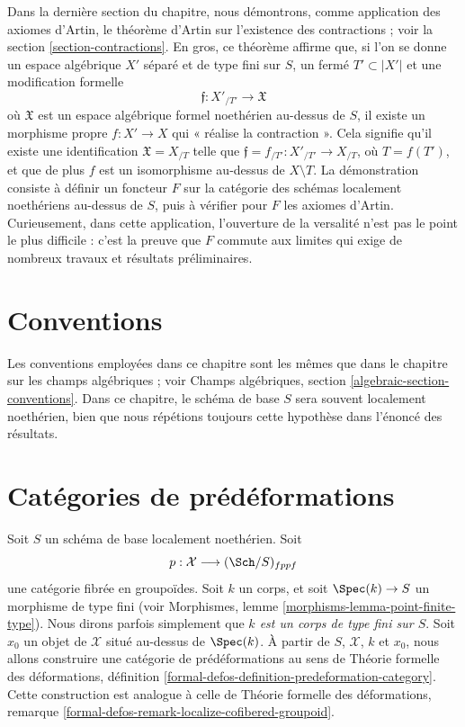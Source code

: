 \medskip\noindent
Dans la dernière section du chapitre, nous démontrons, comme application des
axiomes d'Artin, le théorème d'Artin sur l'existence des contractions ; voir la
section \ref{section-contractions}. En gros, ce théorème affirme que, si l'on se
donne un espace algébrique $X'$ séparé et de type fini sur $S$, un fermé
$T' \subset |X'|$ et une modification formelle
$$
\mathfrak{f} : X'_{/T'} \longrightarrow \mathfrak{X}
$$
où $\mathfrak{X}$ est un espace algébrique formel noethérien au-dessus de $S$,
il existe un morphisme propre $f : X' \to X$ qui « réalise la contraction ».
Cela signifie qu'il existe une identification $\mathfrak{X} = X_{/T}$ telle
que $\mathfrak{f} = f_{/T'} : X'_{/T'} \to X_{/T}$, où $T = f(T')$, et que de
plus $f$ est un isomorphisme au-dessus de $X \setminus T$. La démonstration
consiste à définir un foncteur $F$ sur la catégorie des schémas localement
noethériens au-dessus de $S$, puis à vérifier pour $F$ les axiomes d'Artin.
Curieusement, dans cette application, l'ouverture de la versalité n'est pas le
point le plus difficile : c'est la preuve que $F$ commute aux limites qui exige
de nombreux travaux et résultats préliminaires.




\section{Conventions}
\label{section-conventions}

\noindent
Les conventions employées dans ce chapitre sont les mêmes que dans le chapitre
sur les champs algébriques ; voir Champs algébriques, section
\ref{algebraic-section-conventions}. Dans ce chapitre, le schéma de base $S$
sera souvent localement noethérien, bien que nous répétions toujours cette
hypothèse dans l'énoncé des résultats.





\section{Catégories de prédéformations}
\label{section-predeformation-categories}

\noindent
Soit $S$ un schéma de base localement noethérien. Soit
$$
p : \mathcal{X} \longrightarrow (\Sch/S)_{fppf}
$$
une catégorie fibrée en groupoïdes. Soit $k$ un corps, et soit
$\Spec(k) \to S$ un morphisme de type fini (voir Morphismes, lemme
\ref{morphisms-lemma-point-finite-type}). Nous dirons parfois simplement que
{\it $k$ est un corps de type fini sur $S$}. Soit $x_0$ un objet de
$\mathcal{X}$ situé au-dessus de $\Spec(k)$. À partir de $S$, $\mathcal{X}$,
$k$ et $x_0$, nous allons construire une catégorie de prédéformations au sens
de Théorie formelle des déformations, définition
\ref{formal-defos-definition-predeformation-category}. Cette construction est
analogue à celle de Théorie formelle des déformations, remarque
\ref{formal-defos-remark-localize-cofibered-groupoid}.


